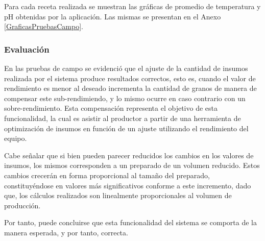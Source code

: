         \par Para cada receta realizada se muestran las gráficas de promedio de temperatura y pH obtenidas por la aplicación. Las mismas se presentan en el Anexo \ref{GraficasPruebasCampo}.
    
    \subsubsection{Evaluación}
        \par En las pruebas de campo se evidenció que el ajuste de la cantidad de insumos realizada por el sistema produce resultados correctos, esto es, cuando el valor de rendimiento es menor al deseado incrementa la cantidad de granos de manera de compensar este sub-rendimiendo, y lo mismo ocurre en caso contrario con un sobre-rendimiento. Esta compensación representa el objetivo de esta funcionalidad, la cual es asistir al productor a partir de una herramienta de optimización de insumos en función de un ajuste utilizando el rendimiento del equipo.
        
        \par Cabe señalar que si bien pueden parecer reducidos los cambios en los valores de insumos, los mismos corresponden a un preparado de un volumen reducido. Estos cambios crecerán en forma proporcional al tamaño del preparado, constituyéndose en valores más significativos conforme a este incremento, dado que, los cálculos realizados son linealmente proporcionales al volumen de producción.
        
        \par Por tanto, puede concluirse que esta funcionalidad del sistema se comporta de la manera esperada, y por tanto, correcta. 
